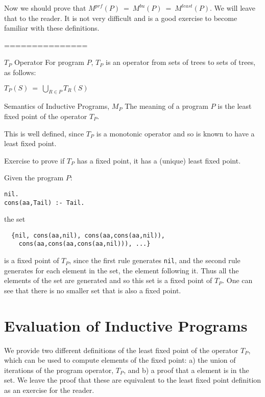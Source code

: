Now we should prove that $M^{prf}(P) ~=~ M^{bu}(P) ~=~ M^{least}(P)$.
We will leave that to the reader.  It is not very difficult and is a
good exercise to become familiar with these definitions.



===============

\begin{definition}{$T_P$ Operator}
  For program $P$, $T_P$ is an operator from sets of trees to sets of
  trees, as follows:
  
  $T_P(S)~=~\bigcup_{R \in P}T_R(S)$
\end{definition}

\begin{definition}{Semantics of Inductive Programs, $M_P$}
The meaning of a program $P$ is the least fixed point of the operator $T_P$.
\end{definition}

This is well defined, since $T_P$ is a monotonic operator and so is
known to have a least fixed point.

Exercise to prove if $T_P$ has a fixed point, it has a (unique) least
fixed point.

\begin{example}
Given the program $P$:
\begin{verbatim}
nil.
cons(aa,Tail) :- Tail.
\end{verbatim}
the set
\begin{verbatim}
  {nil, cons(aa,nil), cons(aa,cons(aa,nil)),
    cons(aa,cons(aa,cons(aa,nil))), ...}
\end{verbatim}
is a fixed point of $T_P$, since the first rule generates {\tt nil},
and the second rule generates for each element in the set, the element
following it.  Thus all the elements of the set are generated and so
this set is a fixed point of $T_P$.  One can see that there is no
smaller set that is also a fixed point.
\end{example}

\section{Evaluation of Inductive Programs}

We provide two different definitions of the least fixed point of the
operator $T_P$, which can be used to compute elements of the fixed
point: a) the union of iterations of the program operator, $T_P$, and
b) a proof that a element is in the set.  We leave the proof that
these are equivalent to the least fixed point definition as an
exercise for the reader.

